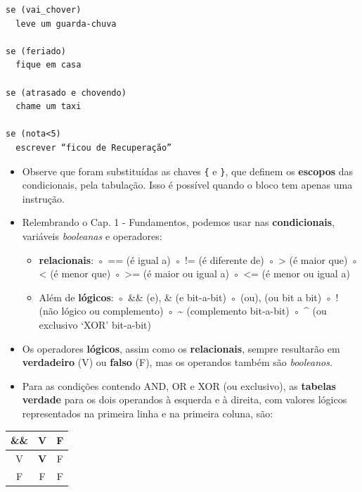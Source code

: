 \documentclass[12pt,a4paper]{article}
\providecommand{\tightlist}{%
      \setlength{\itemsep}{0pt}\setlength{\parskip}{0pt}}
\begin{document}
    \begin{verbatim}
se (vai_chover)
  leve um guarda-chuva

se (feriado)
  fique em casa

se (atrasado e chovendo)  
  chame um taxi

se (nota<5)
  escrever “ficou de Recuperação”
\end{verbatim}

    \begin{itemize}
\item
  Observe que foram substituídas as chaves \texttt{\{} e \texttt{\}},
  que definem os \textbf{escopos} das condicionais, pela tabulação. Isso
  é possível quando o bloco tem apenas uma instrução.
\item
  Relembrando o Cap. 1 - Fundamentos, podemos usar nas
  \textbf{condicionais}, variáveis \emph{booleanas} e operadores:

  \begin{itemize}
  \tightlist
  \item
    \textbf{relacionais}: ◦ == (é igual a) ◦ != (é diferente de) ◦
    \textgreater{} (é maior que) ◦ \textless{} (é menor que) ◦
    \textgreater{}= (é maior ou igual a) ◦ \textless{}= (é menor ou
    igual a)
  \item
    Além de \textbf{lógicos}: ◦ \&\& (e), \& (e bit-a-bit) ◦
    \textbar{}\textbar{} (ou), \textbar{} (ou bit a bit) ◦ ! (não lógico
    ou complemento) ◦ \textasciitilde{} (complemento bit-a-bit) ◦ \^{}
    (ou exclusivo `XOR' bit-a-bit)
  \end{itemize}
\end{itemize}

    \begin{itemize}
\item
  Os operadores \textbf{lógicos}, assim como os \textbf{relacionais},
  sempre resultarão em \textbf{verdadeiro} (V) ou \textbf{falso} (F),
  mas os operandos também são \emph{booleanos}.
\item
  Para as condições contendo AND, OR e XOR (ou exclusivo), as
  \textbf{tabelas verdade} para os dois operandos à esquerda e à
  direita, com valores lógicos representados na primeira linha e na
  primeira coluna, são:
\end{itemize}

    \begin{longtable}[]{@{}ccc@{}}
\toprule
\&\& & V & F\tabularnewline
\midrule
\endhead
V & \textbf{V} & F\tabularnewline
F & F & F\tabularnewline
\bottomrule
\end{longtable}
\end{document}
